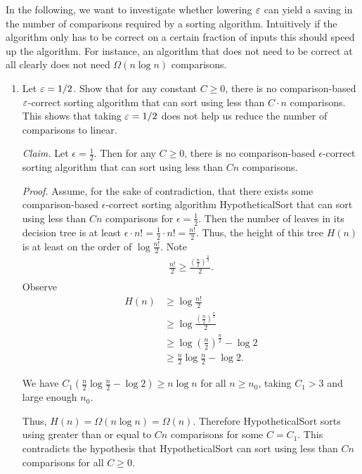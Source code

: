 \noindent
In the following, we want to investigate whether lowering $\varepsilon$ can yield a saving in the number of comparisons required by a sorting algorithm. Intuitively if the algorithm only has to be correct on a certain fraction of inputs this should speed up the algorithm. For instance, an algorithm that does not need to be correct at all clearly does not need $\Omega(n \log n)$ comparisons.  

\begin{enumerate}[resume]
    \item Let $\varepsilon=1/2$. Show that for any constant $C\geq 0$, there is no comparison-based $\varepsilon$-correct sorting algorithm that can sort using less than $C \cdot n$ comparisons. This shows that taking $\varepsilon=1/2$ does not help us reduce the number of comparisons to linear. 
\begin{solution}
\textit{Claim. }Let $\epsilon=\frac{1}{2}$. Then for any $C\geq 0$, there is no comparison-based $\epsilon$-correct sorting algorithm that can sort using less than $Cn$ comparisons.

\textit{Proof. }Assume, for the sake of contradiction, that there exists some comparison-based $\epsilon$-correct sorting algorithm {\sc HypotheticalSort} that can sort using less than $Cn$ comparisons for $\epsilon=\frac{1}{2}$. Then the number of leaves in its decision tree is at least $\epsilon\cdot n!=\frac{1}{2}\cdot n!=\frac{n!}{2}$. Thus, the height of this tree $H(n)$ is at least on the order of $\log{\frac{n!}{2}}$. Note
\begin{align*}
\frac{n!}{2}\geq\frac{\left(\frac{n}{2}\right)^{\frac{n}{2}}}{2}.\\
\end{align*}
Observe
\begin{align*}
H(n)&\geq\log\frac{n!}{2}\\
&\geq\log\frac{\left(\frac{n}{2}\right)^{\frac{n}{2}}}{2}\\
&\geq\log\left(\frac{n}{2}\right)^{\frac{n}{2}}-\log 2\\
&\geq\frac{n}{2}\log\frac{n}{2}-\log 2.
\end{align*}

We have $C_1\left(\frac{n}{2}\log\frac{n}{2}-\log 2\right)\geq n\log n$ for all $n\geq n_0$, taking $C_1>3$ and large enough $n_0$.

Thus, $H(n)=\Omega(n\log n)=\Omega(n)$. Therefore {\sc HypotheticalSort} sorts using greater than or equal to $Cn$ comparisons for some $C=C_1$. This contradicts the hypothesis that {\sc HypotheticalSort} can sort using less than $Cn$ comparisons for all $C\geq 0$.


\end{solution}
\end{enumerate}
